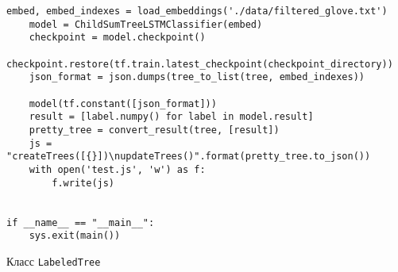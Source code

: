 \begin{lstlisting}[style=app]
    embed, embed_indexes = load_embeddings('./data/filtered_glove.txt')
    model = ChildSumTreeLSTMClassifier(embed)
    checkpoint = model.checkpoint()
    checkpoint.restore(tf.train.latest_checkpoint(checkpoint_directory))
    json_format = json.dumps(tree_to_list(tree, embed_indexes))

    model(tf.constant([json_format]))
    result = [label.numpy() for label in model.result]
    pretty_tree = convert_result(tree, [result])
    js = "createTrees([{}])\nupdateTrees()".format(pretty_tree.to_json())
    with open('test.js', 'w') as f:
        f.write(js)


if __name__ == "__main__":
    sys.exit(main())
\end{lstlisting}

\begin{center}Класс \texttt{LabeledTree}\end{center}

